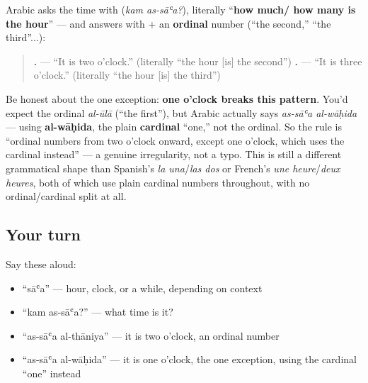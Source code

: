\begin{grammarlens}[title={Grammar Lens: \ar{كم} \ar{الساعة؟} — \textquotedblleft{}how much is the hour?\textquotedblright{}}]
Arabic asks the time with \textbf{ } (\emph{kam as-sāʿa?}), literally \textquotedblleft{}\textbf{how much/ how many is the hour}\textquotedblright{} — and answers with \textbf{} + an \textbf{ordinal} number (\textquotedblleft{}the second,\textquotedblright{} \textquotedblleft{}the third\textquotedblright{}...):

\begin{quote}
\textbf{ .} — \textquotedblleft{}It is two o'clock.\textquotedblright{} (literally \textquotedblleft{}the hour {[}is{]} the second\textquotedblright{}) \textbf{ .} — \textquotedblleft{}It is three o'clock.\textquotedblright{} (literally \textquotedblleft{}the hour {[}is{]} the third\textquotedblright{})
\end{quote}

Be honest about the one exception: \textbf{one o'clock breaks this pattern}. You'd expect the ordinal \emph{al-ūlā} (\textquotedblleft{}the first\textquotedblright{}), but Arabic actually says \emph{as-sāʿa al-wāḥida} — using \textbf{al-wāḥida}, the plain \textbf{cardinal} \textquotedblleft{}one,\textquotedblright{} not the ordinal. So the rule is \textquotedblleft{}ordinal numbers from two o'clock onward, except one o'clock, which uses the cardinal instead\textquotedblright{} — a genuine irregularity, not a typo. This is still a different grammatical shape than Spanish's \emph{la una}/\emph{las dos} or French's \emph{une heure}/\emph{deux heures}, both of which use plain cardinal numbers throughout, with no ordinal/cardinal split at all.
\end{grammarlens}

\subsection*{Your turn}
Say these aloud:

\begin{itemize}
\raggedright
  \item \textquotedblleft{}sāʿa\textquotedblright{} — hour, clock, or a while, depending on context
  \item \textquotedblleft{}kam as-sāʿa?\textquotedblright{} — what time is it?
  \item \textquotedblleft{}as-sāʿa al-thāniya\textquotedblright{} — it is two o'clock, an ordinal number
  \item \textquotedblleft{}as-sāʿa al-wāḥida\textquotedblright{} — it is one o'clock, the one exception, using the cardinal \textquotedblleft{}one\textquotedblright{} instead
\end{itemize}

